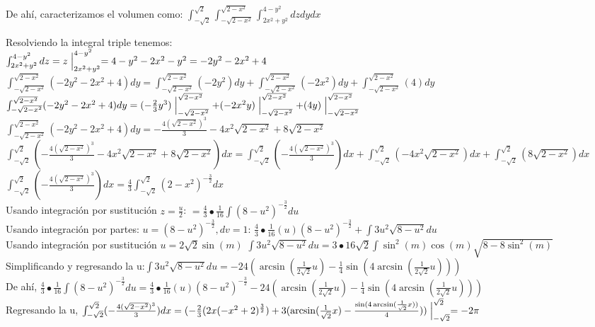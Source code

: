 \documentclass{article}
\begin{document}
\begin{enumerate}
{		De ahí, caracterizamos el volumen como: $\int_{-\sqrt{2}}^{\sqrt{2}}\int_{-\sqrt{2-x^2}}^{\sqrt{2-x^2}}\int_{2x^2+y^2}^{4-y^2}dzdydx$
	
		Resolviendo la integral triple tenemos:\\
		$\int_{2x^2+y^2}^{4-y^2}dz = z\Bigm|_{2x^2+y^2}^{4-y^2} = 4-y^2-2x^2-y^2 = -2y^2-2x^2+4 $\\
		
		$\int_{-\sqrt{2-x^2}}^{\sqrt{2-x^2}} (-2y^2-2x^2+4)dy = \int_{-\sqrt{2-x^2}}^{\sqrt{2-x^2}} (-2y^2)dy +  \int_{-\sqrt{2-x^2}}^{\sqrt{2-x^2}} (-2x^2)dy + \int_{-\sqrt{2-x^2}}^{\sqrt{2-x^2}} (4)dy $\\
		$\int_{-\sqrt{2-x^2}}^{\sqrt{2-x^2}} (-2y^2-2x^2+4)dy = (-\frac{2}{3}y^3)\Bigm|_{-\sqrt{2-x^2}}^{\sqrt{2-x^2}} + (-2x^2y)\Bigm|_{-\sqrt{2-x^2}}^{\sqrt{2-x^2}} + (4y)\Bigm|_{-\sqrt{2-x^2}}^{\sqrt{2-x^2}}$\\
		$\int_{-\sqrt{2-x^2}}^{\sqrt{2-x^2}} (-2y^2-2x^2+4)dy = -\frac{4(\sqrt{2-x^2})^3}{3} -4x^2\sqrt{2-x^2} + 8\sqrt{2-x^2} $\\
		
		$\int_{-\sqrt{2}}^{\sqrt{2}}(-\frac{4(\sqrt{2-x^2})^3}{3} -4x^2\sqrt{2-x^2} + 8\sqrt{2-x^2})dx = \int_{-\sqrt{2}}^{\sqrt{2}}(-\frac{4(\sqrt{2-x^2})^3}{3})dx + \int_{-\sqrt{2}}^{\sqrt{2}}(-4x^2\sqrt{2-x^2})dx+ \int_{-\sqrt{2}}^{\sqrt{2}}(8\sqrt{2-x^2})dx $\\
		
		$\int_{-\sqrt{2}}^{\sqrt{2}}(-\frac{4(\sqrt{2-x^2})^3}{3})dx = \frac{4}{3}\int_{-\sqrt{2}}^{\sqrt{2}}(2-x^2)^{-\frac{3}{2}} dx$\\
		Usando integración por sustitución $z = \frac{u}{2}$:		
		$= \frac{4}{3}\bullet\frac{1}{16}\int(8-u^2)^{-\frac{3}{2}} du $\\
		Usando integración por partes: $u = (8-u^2)^{-\frac{3}{2}} , dv = 1$:
		$\frac{4}{3}\bullet\frac{1}{16}(u)(8-u^2)^{-\frac{3}{2}} + \int3u^2\sqrt{8-u^2}du$\\
		Usando integración por sustitución $u = 2\sqrt{2}\sin(m)$ $\int3u^2\sqrt{8-u^2}du = 3 \bullet 16\sqrt{2} \int \sin^2(m)\cos(m)\sqrt{8-8\sin^2(m)}$\\
		Simplificando y regresando la u:$\int3u^2\sqrt{8-u^2}du = -24(\arcsin(\frac{1}{2\sqrt{2}}u) - \frac{1}{4}\sin(4\arcsin(\frac{1}{2\sqrt{2}}u)))$\\
		De ahí, $\frac{4}{3}\bullet\frac{1}{16}\int(8-u^2)^{-\frac{3}{2}} du = \frac{4}{3}\bullet\frac{1}{16}(u)(8-u^2)^{-\frac{3}{2}} -24(\arcsin(\frac{1}{2\sqrt{2}}u) - \frac{1}{4}\sin(4\arcsin(\frac{1}{2\sqrt{2}}u)))$\\
		Regresando la u, $\int_{-\sqrt{2}}^{\sqrt{2}}(-\frac{4(\sqrt{2-x^2})^3}{3})dx = (-\frac{2}{3}(2x(-x^2 +2)^{\frac{3}{2}}) + 3(\arcsin(\frac{1}{\sqrt{2}}x) - \frac{\sin(4\arcsin(\frac{1}{\sqrt{2}}x))}{4}))\Bigm|_{-\sqrt{2}}^{\sqrt{2}} = -2\pi$\\
		
}
\end{enumerate}
\end{document}
